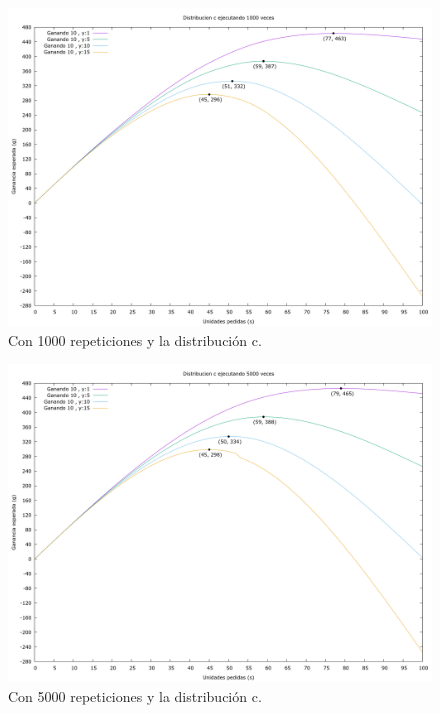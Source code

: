 \documentclass[12pt, spanish]{article}
\begin{document}
\begin{figure}[H]
	\centering
	\includegraphics[scale = 0.2]{prob_c/datos_c_1000.png}
	\caption{Con 1000 repeticiones y la distribución c.}
	\label{fig:ej1_a_1000}

\end{figure}

\begin{figure}[H]
	\centering
	\includegraphics[scale = 0.2]{prob_c/datos_c_5000.png}
	\caption{Con 5000 repeticiones y la distribución c.}
	\label{fig:ej1_a_5000}

\end{figure}
\end{document}
